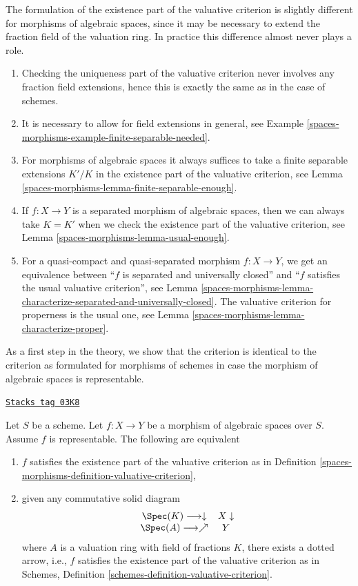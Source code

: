 The formulation of the existence part of the valuative criterion is
slightly different for morphisms of algebraic spaces, since it may be
necessary to extend the fraction field of the valuation ring.
In practice this difference almost never plays a role.
\begin{enumerate}
\item Checking the uniqueness part of the valuative criterion never
involves any fraction field extensions, hence this is exactly the same
as in the case of schemes.
\item It is necessary to allow for field extensions in general, see
Example \ref{spaces-morphisms-example-finite-separable-needed}.
\item For morphisms of algebraic spaces it always suffices to
take a finite separable extensions $K'/K$ in the existence
part of the valuative criterion, see Lemma \ref{spaces-morphisms-lemma-finite-separable-enough}.
\item If $f : X \to Y$ is a separated morphism of algebraic spaces, then
we can always take $K = K'$ when we check the existence part of the
valuative criterion, see Lemma \ref{spaces-morphisms-lemma-usual-enough}.
\item For a quasi-compact and quasi-separated
morphism $f : X \to Y$, we get an equivalence between
``$f$ is separated and universally closed'' and ``$f$ satisfies
the usual valuative criterion'', see
Lemma \ref{spaces-morphisms-lemma-characterize-separated-and-universally-closed}.
The valuative criterion for properness is the usual one, see
Lemma \ref{spaces-morphisms-lemma-characterize-proper}.
\end{enumerate}
As a first step in the theory, we show that the criterion is identical
to the criterion as formulated for morphisms of schemes
in case the morphism of algebraic spaces is representable.

\begin{lemma}
\label{spaces-morphisms-lemma-valuative-criterion-representable}
\href{https://stacks.math.columbia.edu/tag/03K8}{\texttt{Stacks tag 03K8}}

Let $S$ be a scheme.
Let $f : X \to Y$ be a morphism of algebraic spaces over $S$.
Assume $f$ is representable. The following are equivalent
\begin{enumerate}
\item $f$ satisfies the existence part of the valuative criterion
as in Definition \ref{spaces-morphisms-definition-valuative-criterion},
\item given any commutative solid diagram
$$
\begin{array}{cc}\Spec(K) \longrightarrow\downarrow & X \downarrow \\ \Spec(A) \longrightarrow\nearrow & Y\end{array}
$$
where $A$ is a valuation ring with field of fractions $K$, there exists
a dotted arrow, i.e., $f$ satisfies the existence part of the valuative
criterion as in
Schemes, Definition \ref{schemes-definition-valuative-criterion}.
\end{enumerate}
\end{lemma}

